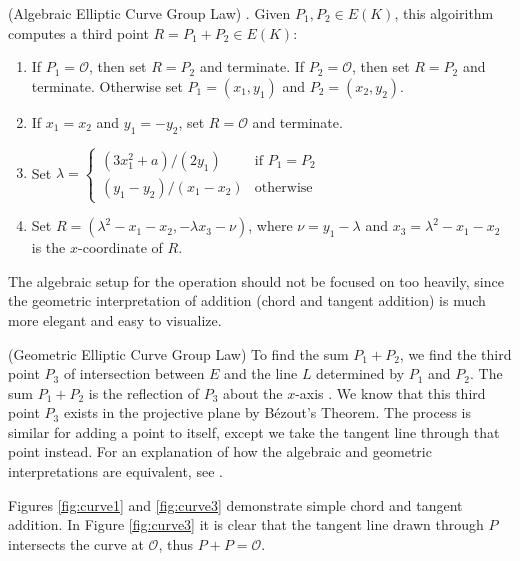 \documentclass[]{../../math_paper}
\begin{document}
\begin{algorithma} \label{grouplaw} (Algebraic Elliptic Curve Group Law) \cite{stein2008elementary}. Given $P_1, P_2 \in E(K)$, this algoirithm computes a third point $R = P_1 + P_2 \in E(K)$:
    \begin{enumerate}
        \item If $P_1 = \mathcal{O}$, then set $R = P_2$ and terminate. If $P_2 = \mathcal{O}$, then set $R = P_2$ and terminate. Otherwise set $P_1 = (x_1, y_1)$ and $P_2 = (x_2, y_2)$.
        \item If $x_1 = x_2$ and $y_1 = -y_2$, set $R = \mathcal{O}$ and terminate.
        \item Set $\lambda = \begin{cases} (3x_1^2 + a) / (2y_1) & \text{if $P_1 = P_2$} \\ (y_1 - y_2)/(x_1 - x_2) & \text{otherwise} \end{cases}$
        \item Set $R = (\lambda^2 - x_1 - x_2, -\lambda x_3 - \nu)$, where $\nu = y_1 - \lambda$ and $x_3 = \lambda^2 - x_1 - x_2$ is the $x$-coordinate of $R$.
    \end{enumerate}
\end{algorithma}

The algebraic setup for the operation should not be focused on too heavily, since the geometric interpretation of addition (chord and tangent addition) is much more elegant and easy to visualize.
\begin{algorithma} \label{geometric} (Geometric Elliptic Curve Group Law)
    To find the sum $P_1 + P_2$, we find the third point $P_3$ of intersection between $E$ and the line $L$ determined by $P_1$ and $P_2$. The sum $P_1 + P_2$ is the reflection of $P_3$ about the $x$-axis \cite{stein2008elementary}. We know that this third point $P_3$ exists in the projective plane by Bézout's Theorem. The process is similar for adding a point to itself, except we take the tangent line through that point instead. For an explanation of how the algebraic and geometric interpretations are equivalent, see \cite{Kline}.
\end{algorithma}

Figures \ref{fig:curve1} and \ref{fig:curve3} demonstrate simple chord and tangent addition. In Figure \ref{fig:curve3} it is clear that the tangent line drawn through $P$ intersects the curve at $\mathcal{O}$, thus $P + P = \mathcal{O}$.
\end{document}
